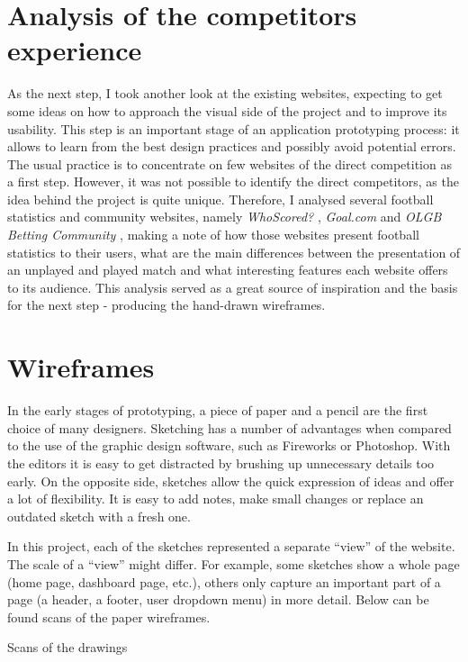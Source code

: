 \section{Analysis of the competitors experience}
\label{sec:competitors_prototype}
As the next step, I took another look at the existing websites, expecting to get some ideas on how to approach the visual side of the project and to improve its usability. This step is an important stage of an application prototyping process: it allows to learn from the best design practices and possibly avoid potential errors. The usual practice is to concentrate on few websites of the direct competition as a first step. However, it was not possible to identify the direct competitors, as the idea behind the project is quite unique. Therefore, I analysed several football statistics and community websites, namely \emph{WhoScored?} \citep{source:whoscored}, \emph{Goal.com} \citep{source:goal} and \emph{OLGB Betting Community} \citep{source:olgb}, making a note of how those websites present football statistics to their users, what are the main differences between the presentation of an unplayed and played match and what interesting features each website offers to its audience. This analysis served as a great source of inspiration and the basis for the next step - producing the hand-drawn wireframes.

\section{Wireframes}
\label{sec:wireframes_prototype}
In the early stages of prototyping, a piece of paper and a pencil are the first choice of many designers. Sketching has a number of advantages when compared to the use of the graphic design software, such as Fireworks or Photoshop. With the editors it is easy to get distracted by brushing up unnecessary details too early. On the opposite side, sketches allow the quick expression of ideas and offer a lot of flexibility. It is easy to add notes, make small changes or replace an outdated sketch with a fresh one.

In this project, each of the sketches represented a separate “view” of the website. The scale of a “view” might differ. For example, some sketches show a whole page (home page, dashboard page, etc.), others only capture an important part of a page (a header, a footer, user dropdown menu) in more detail.  Below can be found scans of the paper wireframes.

Scans of the drawings

